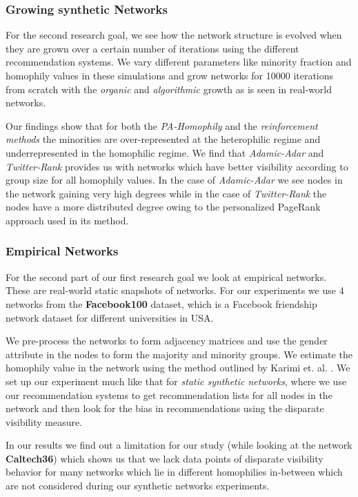\subsubsection{Growing synthetic Networks}
For the second research goal, we see how the network structure is evolved when they are grown over a certain number of iterations using the different recommendation systems. We vary different parameters like minority fraction and homophily values in these simulations and grow networks for 10000 iterations from scratch with the \textit{organic} and \textit{algorithmic} growth as is seen in real-world networks.

Our findings show that for both the \textit{PA-Homophily} and the \textit{reinforcement methods} the minorities are over-represented at the heterophilic regime and underrepresented in the homophilic regime. We find that \textit{Adamic-Adar} and \textit{Twitter-Rank} provides us with networks which have better visibility according to group size for all homophily values. In the case of \textit{Adamic-Adar} we see nodes in the network gaining very high degrees while in the case of \textit{Twitter-Rank} the nodes have a more distributed degree owing to the personalized PageRank approach used in its method.

\subsubsection{Empirical Networks}
For the second part of our first research goal we look at empirical networks. These are real-world static snapshots of networks. For our experiments we use 4 networks from the \textbf{Facebook100} \cite{traud2012social} dataset, which is a Facebook friendship network dataset for different universities in USA. 

We pre-process the networks to form adjacency matrices and use the gender attribute in the nodes to form the majority and minority groups. We estimate the homophily value in the network using the method outlined by Karimi et. al. \cite{karimi2018homophily}. We set up our experiment much like that for \textit{static synthetic networks}, where we use our recommendation systems to get recommendation lists for all nodes in the network and then look for the bias in recommendations using the disparate visibility measure.

In our results we find out a limitation for our study (while looking at the network \textbf{Caltech36}) which shows us that we lack data points of disparate visibility behavior for many networks which lie in different homophilies in-between which are not considered during our synthetic networks experiments.

